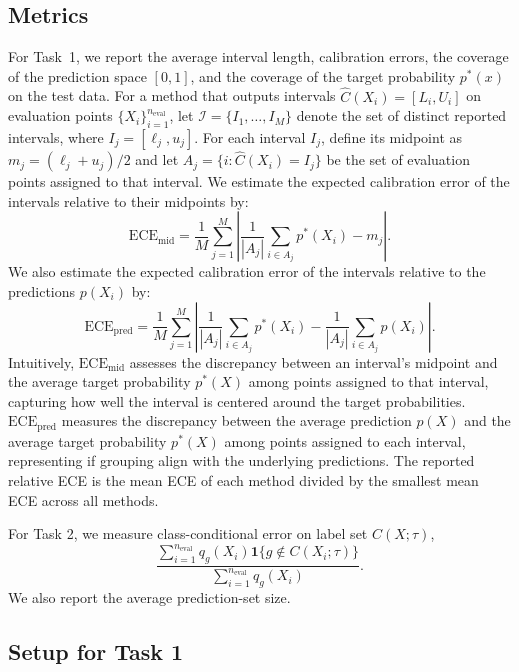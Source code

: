 \documentclass[11pt]{article}
\theoremstyle{statplain}
\theoremstyle{statdefinition}
\newcommand{\0}{\mathbf{0}}
\begin{document}
\subsection{Metrics}
\label{app:metrics}
For Task~1, we report the average interval length, calibration errors, the coverage of the prediction space $[0,1]$, and the coverage of the target probability $p^*(x)$ on the test data. For a method that outputs intervals $\widehat C(X_i)=[L_i,U_i]$ on evaluation points $\{X_i\}_{i=1}^{n_{\mathrm{eval}}}$, let $\mathcal I=\{I_1,\dots,I_M\}$ denote the set of distinct reported intervals, where $I_j=[\ell_j,u_j]$. For each interval $I_j$, define its midpoint as $m_j=(\ell_j+u_j)/2$ and let $A_j=\{i:\widehat C(X_i)=I_j\}$ be the set of evaluation points assigned to that interval. We estimate the expected calibration error of the intervals relative to their midpoints by:
\[
\mathrm{ECE_{mid}}
=
\frac{1}{M}\sum_{j=1}^M
\left|
\frac{1}{|A_j|}\sum_{i\in A_j} p^*(X_i)-m_j
\right|.
\]
We also estimate the expected calibration error of the intervals relative to the predictions $p(X_i)$ by:
\[
\mathrm{ECE_{pred}}
=
\frac{1}{M}\sum_{j=1}^M
\left|
\frac{1}{|A_j|}\sum_{i\in A_j} p^*(X_i)- \frac{1}{|A_j|}\sum_{i\in A_j} p(X_i)
\right|.
\]
Intuitively, $\mathrm{ECE_{mid}}$ assesses the discrepancy between an interval’s midpoint and the average target probability $p^*(X)$ among points assigned to that interval, capturing how well the interval is centered around the target probabilities.
$\mathrm{ECE_{pred}}$ measures the discrepancy between the average prediction $p(X)$ and the average target probability $p^*(X)$ among points assigned to each interval, representing if grouping align with the underlying predictions.
The reported relative ECE is the mean ECE of each method divided by the smallest mean ECE across all methods.

For Task 2, we measure class-conditional error on label set $C(X;\tau)$,
\[
\frac{\sum_{i=1}^{n_{\text{eval}}} q_g(X_i)\mathbf{1}\{g\notin C(X_i;\tau)\}}
     {\sum_{i=1}^{n_{\text{eval}}} q_g(X_i)}.
\] We also report the average prediction-set size.




\subsection{Setup for Task 1}\label{app:task1_setup}
\end{document}
